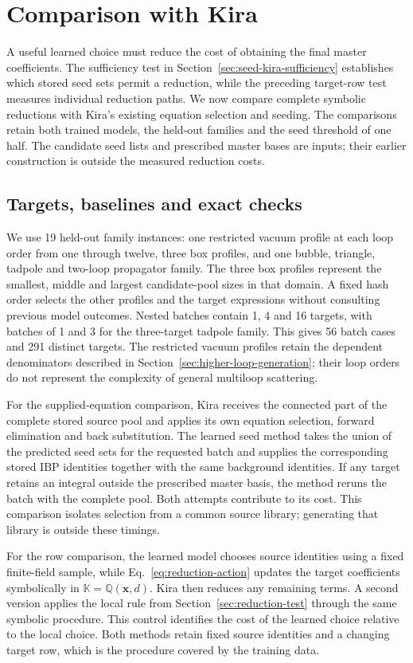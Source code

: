 \section{Comparison with Kira}
\label{sec:cost-comparison}
A useful learned choice must reduce the cost of obtaining the final
master coefficients. The sufficiency test in
Section~\ref{sec:seed-kira-sufficiency} establishes which stored seed
sets permit a reduction, while the preceding target-row test measures
individual reduction paths. We now compare complete symbolic reductions
with Kira's existing equation selection and seeding. The comparisons
retain both trained models, the held-out families and the seed
threshold of one half. The candidate seed lists and prescribed
master bases are inputs; their earlier construction is outside
the measured reduction costs.

\subsection{Targets, baselines and exact checks}
We use 19 held-out family instances: one restricted vacuum profile
at each loop order from one through twelve, three box profiles,
and one bubble, triangle, tadpole and two-loop propagator family.
The three box profiles represent the smallest, middle and largest
candidate-pool sizes in that domain. A fixed hash order selects the
other profiles and the target expressions without consulting previous
model outcomes. Nested batches contain 1, 4 and 16 targets, with
batches of 1 and 3 for the three-target tadpole family.
This gives 56 batch cases and 291 distinct targets.
The restricted vacuum profiles retain the dependent denominators
described in Section~\ref{sec:higher-loop-generation}; their loop orders
do not represent the complexity of general multiloop scattering.

For the supplied-equation comparison, Kira receives the connected
part of the complete stored source pool and applies its own
equation selection, forward elimination and back substitution.
The learned seed method takes the union of the predicted seed sets
for the requested batch and supplies the corresponding stored
IBP identities together with the same background identities.
If any target retains an integral outside the prescribed master
basis, the method reruns the batch with the complete pool.
Both attempts contribute to its cost. This comparison isolates
selection from a common source library; generating that library
is outside these timings.

For the row comparison, the learned model chooses source identities
using a fixed finite-field sample, while
Eq.~\eqref{eq:reduction-action} updates the target coefficients
symbolically in $\mathbb K=\mathbb Q(\boldsymbol x,d)$.
Kira then reduces any remaining terms. A second version applies the
local rule from Section~\ref{sec:reduction-test} through the same
symbolic procedure. This control identifies the cost of the learned
choice relative to the local choice. Both methods retain fixed
source identities and a changing target row, which is the procedure
covered by the training data.

